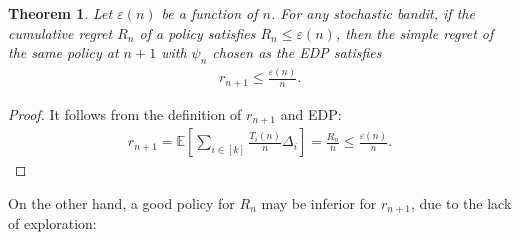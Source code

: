 \documentclass[10pt,a4article]{article}
\numberwithin{equation}{section}
\theoremstyle{plain}
\newtheorem{Th}{Theorem}[section]
\theoremstyle{definition}
\def\E{{\mathbb E}}
\def\e{{\varepsilon}}
\begin{document}
\begin{Th}
Let $\e(n)$ be a function of $n$. For any stochastic bandit, if the cumulative regret $R_n$ of a policy satisfies $R_n\leq\e(n)$, then the simple regret of the same policy at $n+1$ with $\psi_n$ chosen as the EDP satisfies \begin{align*}
r_{n+1}\leq \frac{\e(n)}{n}.
\end{align*}  
\end{Th}
\begin{proof}
It follows from the definition of $r_{n+1}$ and EDP:
\begin{align*}
r_{n+1}=\E\left[\sum_{i\in [k]}\frac{T_i(n)}{n}\Delta_i\right]=\frac{R_n}{n}\leq\frac{\e (n)}{n}. 
\end{align*}
\end{proof}

On the other hand, a good policy for $R_n$ may be inferior for $r_{n+1}$, due to the lack of exploration:
\end{document}
